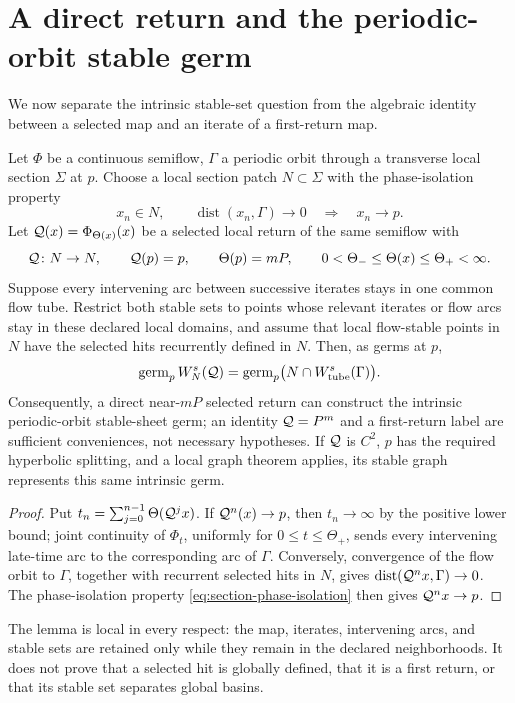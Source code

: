 \section{A direct return and the periodic-orbit stable germ}
\label{sec:stable-germ}

We now separate the intrinsic stable-set question from the algebraic identity
between a selected map and an iterate of a first-return map.

\begin{lemma}
\label{lem:direct-selected-stable-germ}
Let \(\Phi\) be a continuous semiflow, \(\Gamma\) a periodic orbit through a
transverse local section \(\Sigma\) at \(p\).  Choose a local section patch
\(N\subset\Sigma\) with the phase-isolation property
\begin{equation}
 x_n\in N,\qquad \operatorname{dist}(x_n,\Gamma)\to0
 \quad\Longrightarrow\quad x_n\to p.                 \label{eq:section-phase-isolation}
\end{equation}
Let \(\mathcal Q(x)=\Phi_{\Theta(x)}(x)\) be a selected local return of the
same semiflow with
\[
 \mathcal Q\colon N\to N,\qquad \mathcal Q(p)=p,\qquad
 \Theta(p)=mP,\qquad
 0<\Theta_-\le\Theta(x)\le\Theta_+<\infty.
\]
Suppose every intervening arc between successive iterates stays in one common
flow tube.  Restrict both stable sets to points whose relevant iterates or
flow arcs stay in these declared local domains, and assume that local
flow-stable points in \(N\) have the selected hits recurrently defined in
\(N\).  Then, as germs at \(p\),
\begin{equation}
 \operatorname{germ}_p W^s_N(\mathcal Q)
 =\operatorname{germ}_p\bigl(N\cap W^s_{\rm tube}(\Gamma)\bigr).
                                                               \label{eq:direct-return-stable-germ}
\end{equation}
Consequently, a direct near-\(mP\) selected return can construct the intrinsic
periodic-orbit stable-sheet germ; an identity \(\mathcal Q=P^m\) and a
first-return label are sufficient conveniences, not necessary hypotheses.
If \(\mathcal Q\) is \(C^2\), \(p\) has the required hyperbolic splitting,
and a local graph theorem applies, its stable graph represents this same
intrinsic germ.
\end{lemma}

\begin{proof}
Put
\(t_n=\sum_{j=0}^{n-1}\Theta(\mathcal Q^j x)\).  If
\(\mathcal Q^n(x)\to p\), then \(t_n\to\infty\) by the positive lower bound;
joint continuity of \(\Phi_t\), uniformly for
\(0\le t\le\Theta_+\), sends every intervening late-time arc to the
corresponding arc of \(\Gamma\).  Conversely, convergence of the flow orbit
to \(\Gamma\), together with recurrent selected hits in \(N\), gives
\(\operatorname{dist}(\mathcal Q^n x,\Gamma)\to0\).  The phase-isolation
property \cref{eq:section-phase-isolation} then gives
\(\mathcal Q^n x\to p\).
\end{proof}

The lemma is local in every respect: the map, iterates, intervening arcs, and
stable sets are retained only while they remain in the declared
neighborhoods.  It does not prove that a selected hit is globally defined,
that it is a first return, or that its stable set separates global basins.
